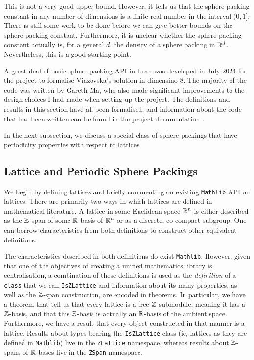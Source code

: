 This is not a very good upper-bound. However, it tells us that the sphere packing constant in any number of dimensions is a finite real number in the interval $(0, 1]$. There is still some work to be done before we can give better bounds on the sphere packing constant. Furthermore, it is unclear whether the sphere packing constant actually is, for a general $d$, the density of a sphere packing in $\mathbb{R}^d$. Nevertheless, this is a good starting point.

A great deal of basic sphere packing API in Lean was developed in July 2024 for the project to formalise Viazovska's solution in dimensino $8$. The majority of the code was written by Gareth Ma, who also made significant improvements to the design choices I had made when setting up the project. The definitions and results in this section have all been formalised, and information about the code that has been written can be found in the project documentation \cite[\texttt{SpherePacking.Basic.SpherePacking}]{documentation}.

In the next subsection, we discuss a special class of sphere packings that have periodicity properties with respect to lattices.

\subsection{Lattice and Periodic Sphere Packings}

We begin by defining lattices and briefly commenting on existing \verb|Mathlib| API on lattices. There are primarily two ways in which lattices are defined in mathematical literature. A lattice in some Euclidean space $\mathbb{R}^n$ is either described as the $\mathbb{Z}$-span of some $\mathbb{R}$-basis of $\mathbb{R}^n$ or as a discrete, co-compact subgroup. One can borrow characteristics from both definitions to construct other equivalent definitions.

The characteristics described in both definitions do exist \verb|Mathlib|. However, given that one of the objectives of creating a unified mathematics library is centralisation, a combination of these definitions is used as the \textit{definition} of a \verb|class| that we call \verb|IsZLattice| and information about its many properties, as well as the $\mathbb{Z}$-span construction, are encoded in theorems. In particular, we have a theorem that tell us that every lattice is a free $\mathbb{Z}$-submodule, meaning it has a $\mathbb{Z}$-basis, and that this $\mathbb{Z}$-basis is actually an $\mathbb{R}$-basis of the ambient space. Furthermore, we have a result that every object constructed in that manner is a lattice. Results about types bearing the \verb|IsZLattice| class (ie, lattices as they are defined in \verb|Mathlib|) live in the \verb|ZLattice| namespace, whereas results about $\mathbb{Z}$-spans of $\mathbb{R}$-bases live in the \verb|ZSpan| namespace. 

